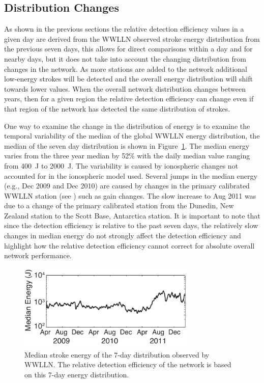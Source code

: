 \subsection{Distribution Changes}

As shown in the previous sections the relative detection efficiency values in a given day are derived from the WWLLN observed stroke energy distribution from the previous seven days, this allows for direct comparisons within a day and for nearby days, but it does not take into account the changing distribution from changes in the network.
As more stations are added to the network additional low-energy strokes will be detected and the overall energy distribution will shift towards lower values.
When the overall network distribution changes between years, then for a given region the relative detection efficiency can change even if that region of the network has detected the same distribution of strokes.


One way to examine the change in the distribution of energy is to examine the temporal variability of the median of the global WWLLN energy distribution, the median of the seven day distribution is shown in Figure~\ref{efficiency:fig:MedianEnergy}.
The median energy varies from the three year median by 52\% with the daily median value ranging from 400~J to 2000~J.
The variability is caused by ionospheric changes not accounted for in the ionospheric model used.
Several jumps in the median energy (e.g., Dec 2009 and Dec 2010) are caused by changes in the primary calibrated WWLLN station (see \citet{Hutchins2012}) such as gain changes.
The slow increase to Aug 2011 was due to a change of the primary calibrated station from the Dunedin, New Zealand station to the Scott Base, Antarctica station.
It is important to note that since the detection efficiency is relative to the past seven days, the relatively slow changes in median energy do not strongly affect the detection efficiency and highlight how the relative detection efficiency cannot correct for absolute overall network performance.

\begin{figure}[ht!]
   \centering
\noindent\includegraphics[width=20pc]{efficiency/Figures/2012RS005049-f8.pdf} 
   \caption{Median stroke energy of the 7-day distribution observed by WWLLN.
The relative detection efficiency of the network is based on this 7-day energy distribution.}
   \label{efficiency:fig:MedianEnergy}
\end{figure}

